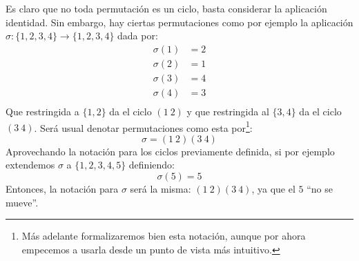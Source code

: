 \begin{notacion}
    Es claro que no toda permutación es un ciclo, basta considerar la aplicación identidad. Sin embargo, hay ciertas permutaciones como por ejemplo la aplicación $\sigma:\{1,2,3,4\}\rightarrow \{1,2,3,4\}$ dada por:
    \begin{align*}
        \sigma(1) &= 2 \\
        \sigma(2) &= 1 \\
        \sigma(3) &= 4 \\
        \sigma(4) &= 3 \\
    \end{align*}
    Que restringida a $\{1,2\}$ da el ciclo $(1\ 2)$ y que restringida al $\{3, 4\}$ da el ciclo $(3\ 4)$. Será usual denotar permutaciones como esta por\footnote{Más adelante formalizaremos bien esta notación, aunque por ahora empecemos a usarla desde un punto de vista más intuitivo.}:
    \begin{equation*}
        \sigma = (1\ 2)(3\ 4)
    \end{equation*}
    Aprovechando la notación para los ciclos previamente definida, si por ejemplo extendemos $\sigma$ a $\{1,2,3,4,5\}$ definiendo:
    \begin{equation*}
        \sigma(5) = 5
    \end{equation*}
    Entonces, la notación para $\sigma$ será la misma: $(1\ 2)(3\ 4)$, ya que el $5$ ``no se mueve''.
\end{notacion}

